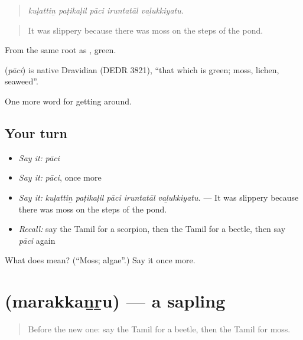 \begin{quote}
\emph{kuḷattiṉ paṭikaḷil pāci iruntatāl vaḻukkiyatu.}
\end{quote}

\begin{quote}
It was slippery because there was moss on the steps of the pond.
\end{quote}

From the same root as , green.

\begin{cousinweb}
\textbf{} (\emph{pāci}) is native Dravidian (DEDR 3821), \textquotedblleft{}that which is green; moss, lichen, seaweed\textquotedblright{}.
\end{cousinweb}

\begin{grammarlens}[title={What you've built}]
One more word for getting around.
\end{grammarlens}

\subsection*{Your turn}
\begin{itemize}
\raggedright
  \item \emph{Say it:} \emph{pāci}
  \item \emph{Say it:} \emph{pāci}, once more
  \item \emph{Say it:} \emph{kuḷattiṉ paṭikaḷil pāci iruntatāl vaḻukkiyatu.} — It was slippery because there was moss on the steps of the pond.
  \item \emph{Recall:} say the Tamil for a scorpion, then the Tamil for a beetle, then say \emph{pāci} again
\end{itemize}

\begin{tcolorbox}[breakable,colback=teal!4,colframe=teal!35!black,title={Before you move on}]
What does  mean? (\textquotedblleft{}Moss; algae\textquotedblright{}.) Say it once more.
\end{tcolorbox}
\section[\texorpdfstring{\ta{மரக்கன்று} (marakkaṉṟu)}{மரக்கன்று (marakkaṉṟu)}]{ (marakkaṉṟu) — a sapling}

\label{lesson:TA-C439-marakkanru}



\begin{quote}
Before the new one: say the Tamil for a beetle, then the Tamil for moss.
\end{quote}

